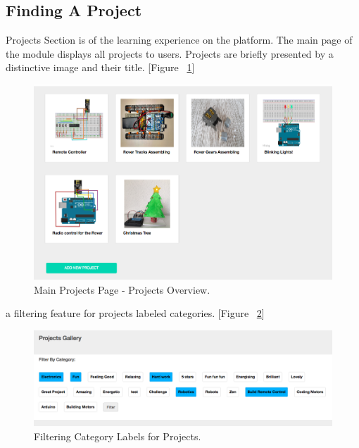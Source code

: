 

\subsection{Finding A Project}

Projects Section is  of the learning experience on the platform.
The main page of the module displays all projects to users. Projects are briefly presented by a distinctive image and their title. [Figure ~\ref{fig:projects_display}]\\

\begin{figure}[h!]
\includegraphics[width=1\linewidth]{images/ui/DisplayProjects.png}
\caption{Main Projects Page - Projects Overview.}
\label{fig:projects_display}
\end{figure}


 a filtering feature for projects  labeled categories. [Figure ~\ref{fig:labels}] 

\begin{figure}[h!]
\centering
\includegraphics[width=\linewidth]{images/ui/Labels.png}
\caption{Filtering Category Labels for Projects.}
\label{fig:labels}
\end{figure}


